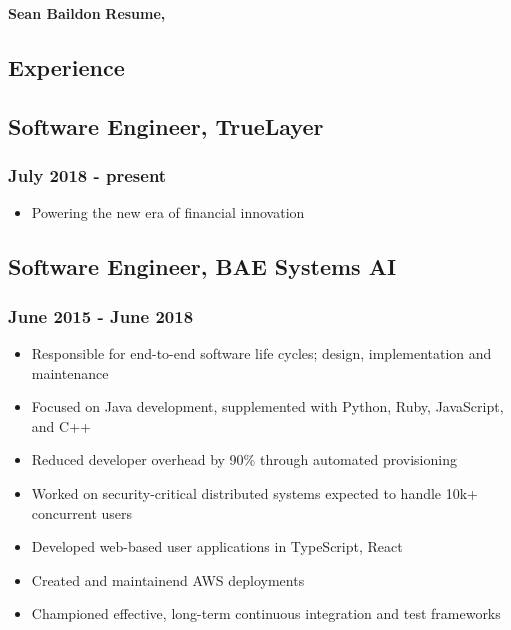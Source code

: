 \documentclass[a4paper,11pt]{article}
\begin{document}
\large
\noindent\textbf{Sean Baildon}
\hfill
\noindent\textbf{Resume, \the\year}
\normalsize

\vspace{2ex}
\hrulefill{}
\vspace{1ex}

\begin{multicols*}{2}

\section*{Experience}
\subsection*{Software Engineer, TrueLayer}
\subsubsection*{July 2018 - present}
\begin{itemize}[leftmargin=*]
	\item Powering the new era of financial innovation
\end{itemize}

\subsection*{Software Engineer, BAE Systems AI}
\subsubsection*{June 2015 - June 2018}
\begin{itemize}[leftmargin=*]
	\item Responsible for end-to-end software life cycles; design, implementation and maintenance
	\item Focused on Java development, supplemented with Python, Ruby, JavaScript, and C++
	\item Reduced developer overhead by 90\% through automated provisioning
	\item Worked on security-critical distributed systems expected to handle 10k+ concurrent users
	\item Developed web-based user applications in TypeScript, React
	\item Created and maintainend AWS deployments
	\item Championed effective, long-term continuous integration and test frameworks
\end{itemize}


\end{multicols*}
\end{document}
